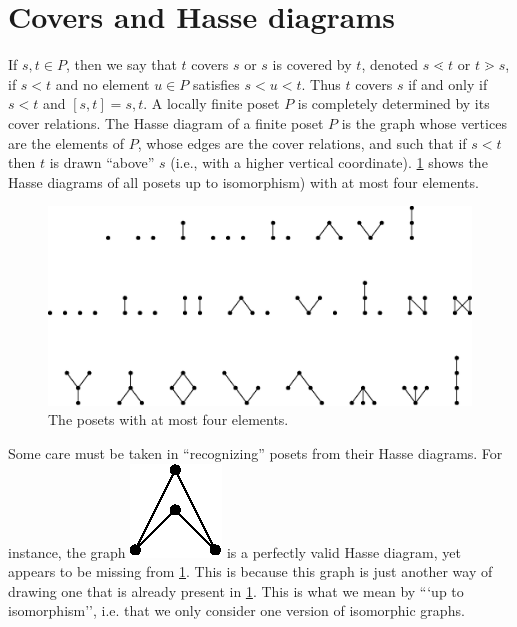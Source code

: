 \section{Covers and Hasse diagrams}
\label{tree:poset:hasse}

If $s, t \in P$, then we say that $t$ covers $s$ or $s$ is covered by $t$, denoted $s \lessdot t$ or $t \gtrdot s$, if $s < t$ and no element $u \in P$ satisfies $s < u < t$. Thus $t$ covers $s$ if and only if $s < t$ and $[s, t] = {s, t}$. A locally finite poset $P$ is completely determined by its cover relations. The Hasse diagram of a finite poset $P$ is the graph whose vertices are the elements of $P$, whose edges are the cover relations, and such that if $s < t$ then $t$ is drawn “above” $s$ (i.e., with a higher vertical coordinate). \ref{fig:stanley:3-1} shows the Hasse diagrams of all posets up to isomorphism) with at most four elements.

\begin{figure}
	\centering
	\includegraphics[width=\textwidth]{fig/stanley/3-1}
	\caption{\label{fig:stanley:3-1} The posets with at most four elements. \cite{Stanley:2011:ECV:2124415}}
\end{figure}

Some care must be taken in “recognizing” posets from their Hasse diagrams. For instance, the graph \includegraphics{fig/stanley/3-1:a} is a perfectly valid Hasse diagram, yet appears to be missing from \ref{fig:stanley:3-1}. This is because this graph is just another way of drawing one that is already present in \ref{fig:stanley:3-1}. This is what we mean by ```up to isomorphism'', i.e. that we only consider one version of isomorphic graphs.


